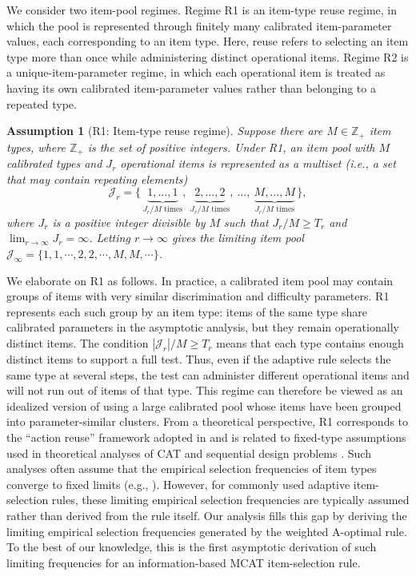 \documentclass[12pt]{article}
\newtheorem{assumption}{Assumption}
\begin{document}
We consider two item-pool regimes. Regime R1 is an item-type reuse regime, in which the pool is represented through finitely many calibrated item-parameter values, each corresponding to an item type. Here, reuse refers to selecting an item type more than once while administering distinct operational items. Regime R2 is a unique-item-parameter regime, in which each operational item is treated as having its own calibrated item-parameter values rather than belonging to a repeated type.
\begin{assumption}[R1: Item-type reuse regime] \label{ass:r1}
Suppose there are $M \in \mathbb{Z}_+$ item types, where $\mathbb{Z}_+$ is the set of positive integers.  
Under R1, an item pool with $M$ calibrated types and $J_r$ operational items is represented as a multiset (i.e., a set that may contain repeating elements)
\begin{equation} \label{e:r1}
\mathcal{J}_{r} 
= \{\,\underbrace{1,\ldots,1}_{J_r/M\text{ times}},\
     \underbrace{2,\ldots,2}_{J_r/M\text{ times}},\ \ldots,\
     \underbrace{M,\ldots,M}_{J_r/M\text{ times}}\,\}, 
\end{equation}
where $J_r$ is a positive integer divisible by $M$ such that $J_r/M\geq T_r$ and $\lim_{r\to\infty}J_r=\infty$.
Letting $r \to \infty$ gives the limiting item pool $\mathcal{J}_{\infty} = \{1, 1, \cdots, 2, 2, \cdots, M, M, \cdots\}$. 
\end{assumption}
We elaborate on R1 as follows.
In practice, a calibrated item pool may contain groups of items with very similar discrimination and difficulty parameters. R1 represents each such group by an item type: items of the same type share calibrated parameters in the asymptotic analysis, but they remain operationally distinct items. The condition $|\mathcal{J}_r|/M \ge T_r$ means that each type contains enough distinct items to support a full test. Thus, even if the adaptive rule selects the same type at several steps, the test can administer different operational items and will not run out of items of that type. This regime can therefore be viewed as an idealized version of using a large calibrated pool whose items have been grouped into parameter-similar clusters. From a theoretical perspective, R1 corresponds to the ``action reuse'' framework adopted in  and is related to fixed-type assumptions used in theoretical analyses of CAT and sequential design problems \cite{bartroff2008modern,wang2015sequential}. Such analyses often assume that the empirical selection frequencies of item types converge to fixed limits (e.g., ). However, for commonly used adaptive item-selection rules, these limiting empirical selection frequencies are typically assumed rather than derived from the rule itself. Our analysis fills this gap by deriving the limiting empirical selection frequencies generated by the weighted A-optimal rule. To the best of our knowledge, this is the first asymptotic derivation of such limiting frequencies for an information-based MCAT item-selection rule.
\end{document}
